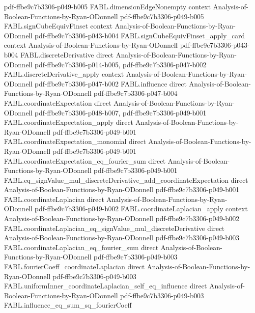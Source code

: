 \begin{theorem}
  {pdf-ffbe9c7b3306-p049-b005}
\proofstep
  {FABL.dimensionEdgeNonempty}
  {context}
  {Analysis-of-Boolean-Functions-by-Ryan-ODonnell}
  {pdf-ffbe9c7b3306-p049-b005}
\proofstep
  {FABL.signCubeEquivFinset}
  {context}
  {Analysis-of-Boolean-Functions-by-Ryan-ODonnell}
  {pdf-ffbe9c7b3306-p043-b004}
\proofstep
  {FABL.signCubeEquivFinset_apply_card}
  {context}
  {Analysis-of-Boolean-Functions-by-Ryan-ODonnell}
  {pdf-ffbe9c7b3306-p043-b004}
\proofstep
  {FABL.discreteDerivative}
  {direct}
  {Analysis-of-Boolean-Functions-by-Ryan-ODonnell}
  {pdf-ffbe9c7b3306-p014-b005,
    pdf-ffbe9c7b3306-p047-b002}
\proofstep
  {FABL.discreteDerivative_apply}
  {context}
  {Analysis-of-Boolean-Functions-by-Ryan-ODonnell}
  {pdf-ffbe9c7b3306-p047-b002}
\proofstep
  {FABL.influence}
  {direct}
  {Analysis-of-Boolean-Functions-by-Ryan-ODonnell}
  {pdf-ffbe9c7b3306-p047-b004}
\proofstep
  {FABL.coordinateExpectation}
  {direct}
  {Analysis-of-Boolean-Functions-by-Ryan-ODonnell}
  {pdf-ffbe9c7b3306-p048-b007,
    pdf-ffbe9c7b3306-p049-b001}
\proofstep
  {FABL.coordinateExpectation_apply}
  {direct}
  {Analysis-of-Boolean-Functions-by-Ryan-ODonnell}
  {pdf-ffbe9c7b3306-p049-b001}
\proofstep
  {FABL.coordinateExpectation_monomial}
  {direct}
  {Analysis-of-Boolean-Functions-by-Ryan-ODonnell}
  {pdf-ffbe9c7b3306-p049-b001}
\proofstep
  {FABL.coordinateExpectation_eq_fourier_sum}
  {direct}
  {Analysis-of-Boolean-Functions-by-Ryan-ODonnell}
  {pdf-ffbe9c7b3306-p049-b001}
\proofstep
  {FABL.eq_signValue_mul_discreteDerivative_add_coordinateExpectation}
  {direct}
  {Analysis-of-Boolean-Functions-by-Ryan-ODonnell}
  {pdf-ffbe9c7b3306-p049-b001}
\proofstep
  {FABL.coordinateLaplacian}
  {direct}
  {Analysis-of-Boolean-Functions-by-Ryan-ODonnell}
  {pdf-ffbe9c7b3306-p049-b002}
\proofstep
  {FABL.coordinateLaplacian_apply}
  {context}
  {Analysis-of-Boolean-Functions-by-Ryan-ODonnell}
  {pdf-ffbe9c7b3306-p049-b002}
\proofstep
  {FABL.coordinateLaplacian_eq_signValue_mul_discreteDerivative}
  {direct}
  {Analysis-of-Boolean-Functions-by-Ryan-ODonnell}
  {pdf-ffbe9c7b3306-p049-b003}
\proofstep
  {FABL.coordinateLaplacian_eq_fourier_sum}
  {direct}
  {Analysis-of-Boolean-Functions-by-Ryan-ODonnell}
  {pdf-ffbe9c7b3306-p049-b003}
\proofstep
  {FABL.fourierCoeff_coordinateLaplacian}
  {direct}
  {Analysis-of-Boolean-Functions-by-Ryan-ODonnell}
  {pdf-ffbe9c7b3306-p049-b003}
\proofstep
  {FABL.uniformInner_coordinateLaplacian_self_eq_influence}
  {direct}
  {Analysis-of-Boolean-Functions-by-Ryan-ODonnell}
  {pdf-ffbe9c7b3306-p049-b003}
\proofstep
  {FABL.influence_eq_sum_sq_fourierCoeff}

\end{theorem}
